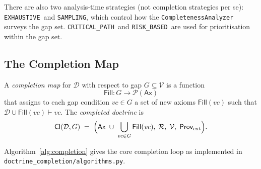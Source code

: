 \documentclass[11pt]{article}
\newcommand{\Doct}{\mathcal{D}}           %
\newcommand{\Ax}{\mathsf{Ax}}             %
\newcommand{\Rules}{\mathcal{R}}          %
\newcommand{\Prov}{\mathsf{Prov}}         %
\newcommand{\Fill}{\mathsf{Fill}}         %
\newcommand{\Cl}{\mathsf{Cl}}             %
\newcommand{\VC}{\mathit{vc}}             %
\newcommand{\VCset}{\mathcal{V}}          %
\newcommand{\EXHAUSTIVE}{\texttt{EXHAUSTIVE}}
\newcommand{\SAMPLING}{\texttt{SAMPLING}}
\newcommand{\CRITPATH}{\texttt{CRITICAL\_PATH}}
\newcommand{\RISKBASED}{\texttt{RISK\_BASED}}
\begin{document}
There are also two analysis-time strategies (not completion strategies
per se): \EXHAUSTIVE\ and \SAMPLING, which control how the
\texttt{CompletenessAnalyzer} surveys the gap set.  \CRITPATH\
and \RISKBASED\ are used for prioritisation within the gap set.

\subsection{The Completion Map}

\begin{definition}\label{def:completion-map}
A \emph{completion map} for $\Doct$ with respect to gap $G \subseteq \VCset$ is a
function
\[
  \Fill \colon G \to \mathcal{P}(\Ax)
\]
that assigns to each gap condition $\VC \in G$ a set of new axioms
$\Fill(\VC)$ such that $\Doct \cup \Fill(\VC) \vdash \VC$.
The \emph{completed doctrine} is
\[
  \Cl(\Doct, G) \;=\;
    \Bigl(\Ax \;\cup\; \bigcup_{\VC \in G} \Fill(\VC),\;
          \Rules,\; \VCset,\; \Prov_{\mathrm{ext}}\Bigr).
\]
\end{definition}

Algorithm~\ref{alg:completion} gives the core completion loop as
implemented in \texttt{doctrine\_completion/algorithms.py}.
\end{document}
